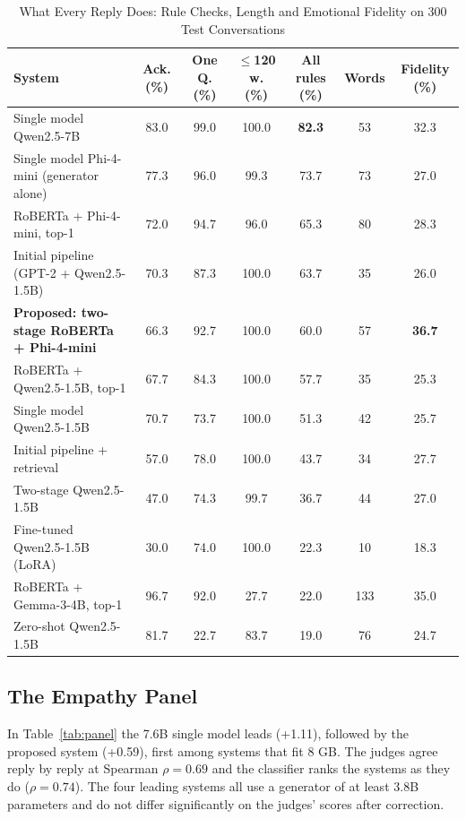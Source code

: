 \documentclass[conference]{IEEEtran}
\begin{document}
\begin{table}[htbp]
\caption{What Every Reply Does: Rule Checks, Length and Emotional Fidelity on 300 Test Conversations}
\begin{center}
\begin{tabular}{|l|c|c|c|c|c|c|}
\hline
\textbf{System} & \textbf{Ack. (\%)} & \textbf{One Q. (\%)} & \textbf{$\leq$120 w. (\%)} & \textbf{All rules (\%)} & \textbf{Words} & \textbf{Fidelity (\%)} \\
\hline
Single model Qwen2.5-7B & 83.0 & 99.0 & 100.0 & \textbf{82.3} & 53 & 32.3 \\
Single model Phi-4-mini (generator alone) & 77.3 & 96.0 & 99.3 & 73.7 & 73 & 27.0 \\
RoBERTa + Phi-4-mini, top-1 & 72.0 & 94.7 & 96.0 & 65.3 & 80 & 28.3 \\
Initial pipeline (GPT-2 + Qwen2.5-1.5B) & 70.3 & 87.3 & 100.0 & 63.7 & 35 & 26.0 \\
\textbf{Proposed: two-stage RoBERTa + Phi-4-mini} & 66.3 & 92.7 & 100.0 & 60.0 & 57 & \textbf{36.7} \\
RoBERTa + Qwen2.5-1.5B, top-1 & 67.7 & 84.3 & 100.0 & 57.7 & 35 & 25.3 \\
Single model Qwen2.5-1.5B & 70.7 & 73.7 & 100.0 & 51.3 & 42 & 25.7 \\
Initial pipeline + retrieval & 57.0 & 78.0 & 100.0 & 43.7 & 34 & 27.7 \\
Two-stage Qwen2.5-1.5B & 47.0 & 74.3 & 99.7 & 36.7 & 44 & 27.0 \\
Fine-tuned Qwen2.5-1.5B (LoRA) & 30.0 & 74.0 & 100.0 & 22.3 & 10 & 18.3 \\
RoBERTa + Gemma-3-4B, top-1 & 96.7 & 92.0 & 27.7 & 22.0 & 133 & 35.0 \\
Zero-shot Qwen2.5-1.5B & 81.7 & 22.7 & 83.7 & 19.0 & 76 & 24.7 \\
\hline
\end{tabular}
\label{tab:main}
\end{center}
\end{table}

\subsection{The Empathy Panel}
In Table~\ref{tab:panel} the 7.6B single model leads (+1.11), followed by the proposed system (+0.59), first among systems that fit 8 GB. The judges agree reply by reply at Spearman $\rho=0.69$ and the classifier ranks the systems as they do ($\rho=0.74$). The four leading systems all use a generator of at least 3.8B parameters and do not differ significantly on the judges' scores after correction.
\end{document}
